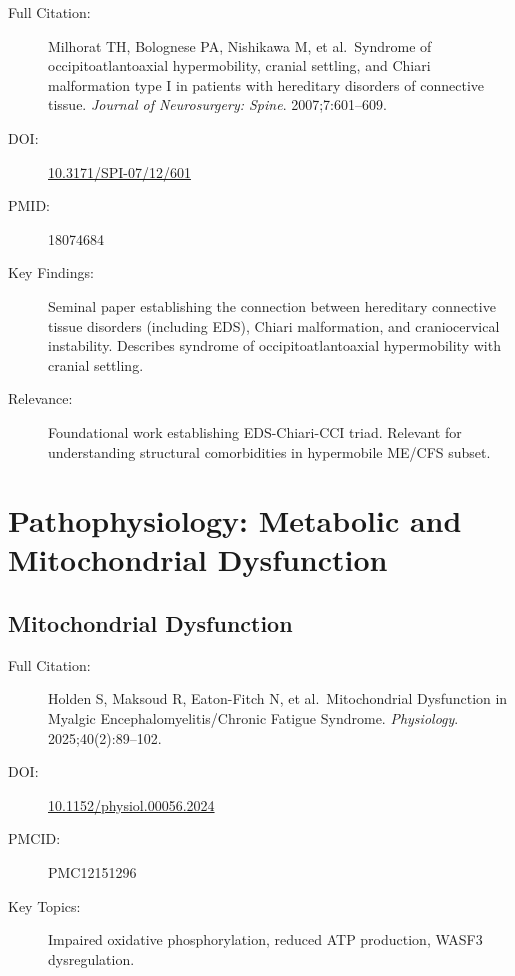 \begin{description}
    \item[Full Citation:] Milhorat TH, Bolognese PA, Nishikawa M, et al.\ Syndrome of occipitoatlantoaxial hypermobility, cranial settling, and Chiari malformation type I in patients with hereditary disorders of connective tissue. \textit{Journal of Neurosurgery: Spine}. 2007;7:601--609.
    \item[DOI:] \href{https://doi.org/10.3171/SPI-07/12/601}{10.3171/SPI-07/12/601}
    \item[PMID:] 18074684
    \item[Key Findings:] Seminal paper establishing the connection between hereditary connective tissue disorders (including EDS), Chiari malformation, and craniocervical instability. Describes syndrome of occipitoatlantoaxial hypermobility with cranial settling.
    \item[Relevance:] Foundational work establishing EDS-Chiari-CCI triad. Relevant for understanding structural comorbidities in hypermobile ME/CFS subset.
\end{description}

\section{Pathophysiology: Metabolic and Mitochondrial Dysfunction}
\label{sec:bib-metabolic}

\subsection{Mitochondrial Dysfunction}

\begin{description}
    \item[Full Citation:] Holden S, Maksoud R, Eaton-Fitch N, et al.\ Mitochondrial Dysfunction in Myalgic Encephalomyelitis/Chronic Fatigue Syndrome. \textit{Physiology}. 2025;40(2):89--102.
    \item[DOI:] \href{https://doi.org/10.1152/physiol.00056.2024}{10.1152/physiol.00056.2024}
    \item[PMCID:] PMC12151296
    \item[Key Topics:] Impaired oxidative phosphorylation, reduced ATP production, WASF3 dysregulation.
\end{description}

